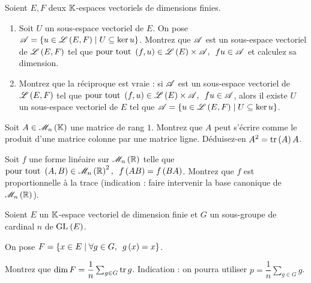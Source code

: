 \begin{corr}
\end{corr}

\begin{exoss}[Exercice 20]
Soient \(E,F\) deux \(\mathbb{K}\)-espaces vectoriels de dimensions finies.

\begin{enumerate}
    \item Soit \(U\) un sous-espace vectoriel de \(E\). On pose \(\mathscr{A}=\left\lbrace u\in\mathscr{L}\left(E,F\right)\;\middle|\; U\subseteq\ker u\right\rbrace\). Montrez que \(\mathscr{A}\) est un sous-espace vectoriel de \(\mathscr{L}\left(E,F\right)\) tel que \(\quantifs{\tpt\paren{f,u}\in\Lendo{E}\times\fami{A}}fu\in\fami{A}\) et calculez sa dimension. \\
    \item Montrez que la réciproque est vraie : si \(\mathscr{A}\) est un sous-espace vectoriel de \(\mathscr{L}\left(E,F\right)\) tel que \(\quantifs{\tpt\paren{f,u}\in\Lendo{E}\times\fami{A}}fu\in\fami{A}\), alors il existe \(U\) un sous-espace vectoriel de \(E\) tel que \(\mathscr{A}=\left\lbrace u\in\mathscr{L}\left(E,F\right)\;\middle|\; U\subseteq\ker u\right\rbrace\).
\end{enumerate}
\end{exoss}

\begin{corr}
\end{corr}

\begin{exops}[Exercice 21]
Soit \(A\in\M{n}\) une matrice de rang \(1\). Montrez que \(A\) peut s'écrire comme le produit d'une matrice colonne par une matrice ligne. Déduisez-en \(A^2=\operatorname{tr}\left(A\right)A\).
\end{exops}

\begin{corr}
\end{corr}

\begin{exopss}[Exercice 22]
Soit \(f\) une forme linéaire sur \(\M{n}[\R]\) telle que \(\quantifs{\tpt\paren{A,B}\in\M{n}[\R]^2}f\paren{AB}=f\paren{BA}\). Montrez que \(f\) est proportionnelle à la trace (indication : faire intervenir la base canonique de \(\M{n}[\R]\)).
\end{exopss}

\begin{corr}
\end{corr}

\begin{exosss}[Exercice 23]
Soient \(E\) un \(\mathbb{K}\)-espace vectoriel de dimension finie et \(G\) un sous-groupe de cardinal \(n\) de \(\GL{}[E]\).

On pose \(F=\accol{x\in E\tq\quantifs{\forall g\in G}g\paren{x}=x}\).

Montrez que \(\dim F=\dfrac{1}{n}\sum_{g\in G}\operatorname{tr} g\). Indication : on pourra utiliser \(p=\dfrac{1}{n}\sum_{g\in G}g\).
\end{exosss}


